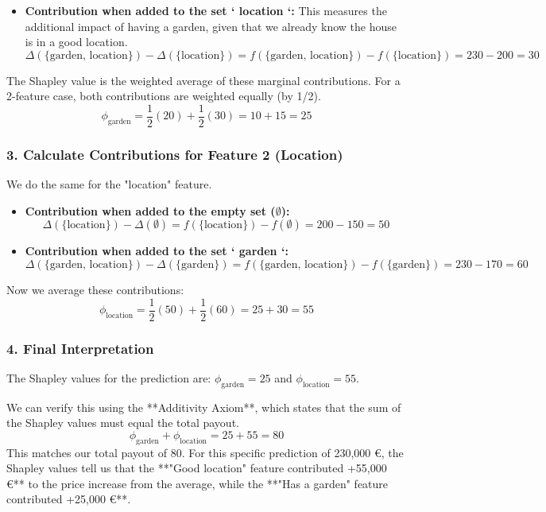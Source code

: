 \documentclass{article}
\begin{document}
\begin{multicols}{2}
\begin{itemize}
    \item \textbf{Contribution when added to the set ` {location} `:}
    This measures the additional impact of having a garden, given that we already know the house is in a good location.
    $$\Delta(\{\text{garden, location}\}) - \Delta(\{\text{location}\}) = f(\{\text{garden, location}\}) - f(\{\text{location}\}) = 230 - 200 = 30$$
\end{itemize}
The Shapley value is the weighted average of these marginal contributions. For a 2-feature case, both contributions are weighted equally (by 1/2).
$$\phi_{\text{garden}} = \frac{1}{2}(20) + \frac{1}{2}(30) = 10 + 15 = 25$$

\subsubsection{3. Calculate Contributions for Feature 2 (Location)}
We do the same for the "location" feature.
\begin{itemize}
    \item \textbf{Contribution when added to the empty set ($\emptyset$):}
    $$\Delta(\{\text{location}\}) - \Delta(\emptyset) = f(\{\text{location}\}) - f(\emptyset) = 200 - 150 = 50$$

    \item \textbf{Contribution when added to the set ` {garden} `:}
    $$\Delta(\{\text{garden, location}\}) - \Delta(\{\text{garden}\}) = f(\{\text{garden, location}\}) - f(\{\text{garden}\}) = 230 - 170 = 60$$
\end{itemize}
Now we average these contributions:
$$\phi_{\text{location}} = \frac{1}{2}(50) + \frac{1}{2}(60) = 25 + 30 = 55$$

\subsubsection{4. Final Interpretation}
The Shapley values for the prediction are: $\phi_{\text{garden}} = 25$ and $\phi_{\text{location}} = 55$.

We can verify this using the **Additivity Axiom**, which states that the sum of the Shapley values must equal the total payout.
$$\phi_{\text{garden}} + \phi_{\text{location}} = 25 + 55 = 80$$
This matches our total payout of 80. For this specific prediction of 230,000 €, the Shapley values tell us that the **"Good location" feature contributed +55,000 €** to the price increase from the average, while the **"Has a garden" feature contributed +25,000 €**.


\end{multicols}
\end{document}
